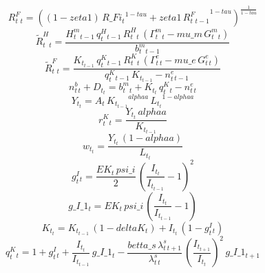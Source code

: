 \begin{dmath}
{ R^F_t  _{t}}=\left(\left(1-{zeta1}\right)\, {R\_Fi_{t}}^{1-{tau}}+{zeta1}\, { R^F_t  _{t-1}}^{1-{tau}}\right)^{\frac{1}{1-{tau}}}
\end{dmath}
\begin{dmath}
{  \tilde{R}^H_t _{t}}=\frac{{ H^m_t _{t-1}}\, { q^H_t  _{t-1}}\, {   R^H_t_{t}}\, \left({ \Gamma^m_t _{t}}-{mu\_m}\, { G^m_t _{t}}\right)}{{ b^m_t _{t-1}}}
\end{dmath}
\begin{dmath}
{  \tilde{R}^F_t _{t}}=\frac{{ K_t _{t-1}}\, {  q^K_t _{t-1}}\, {  R^K_t _{t}}\, \left({ \Gamma^e_t _{t}}-{mu\_e}\, { G^e_t _{t}}\right)}{{  q^K_t _{t-1}}\, { K_t _{t-1}}-{ n^e_t _{t-1}}}
\end{dmath}
\begin{dmath}
{ n^b_t _{t}}+{ D_t _{t}}={ b^m_t _{t}}+{ K_t _{t}}\, {  q^K_t _{t}}-{ n^e_t _{t}}
\end{dmath}
\begin{dmath}
{ Y_t  _{t}}={ A _{t}}\, { K_t _{t-1}}^{{alphaa}}\, { L_t _{t}}^{1-{alphaa}}
\end{dmath}
\begin{dmath}
{ r^K_t  _{t}}=\frac{{ Y_t  _{t}}\, {alphaa}}{{ K_t _{t-1}}}
\end{dmath}
\begin{dmath}
{ w_t  _{t}}=\frac{{ Y_t  _{t}}\, \left(1-{alphaa}\right)}{{ L_t _{t}}}
\end{dmath}
\begin{dmath}
{ g^I_t _{t}}=\frac{{EK_{t}}\, {psi\_i}}{2}\, \left(\frac{{ I_t _{t}}}{{ I_t _{t-1}}}-1\right)^{2}
\end{dmath}
\begin{dmath}
{g\_I\_1_{t}}={EK_{t}}\, {psi\_i}\, \left(\frac{{ I_t _{t}}}{{ I_t _{t-1}}}-1\right)
\end{dmath}
\begin{dmath}
{ K_t _{t}}={ K_t _{t-1}}\, \left(1-{deltaK_{t}}\right)+{ I_t _{t}}\, \left(1-{ g^I_t _{t}}\right)
\end{dmath}
\begin{dmath}
{  q^K_t _{t}}=1+{ g^I_t _{t}}+\frac{{ I_t _{t}}}{{ I_t _{t-1}}}\, {g\_I\_1_{t}}-\frac{{betta\_s}\, { \lambda^s_t _{t+1}}}{{ \lambda^s_t _{t}}}\, \left(\frac{{ I_t _{t+1}}}{{ I_t _{t}}}\right)^{2}\, {g\_I\_1_{t+1}}
\end{dmath}
